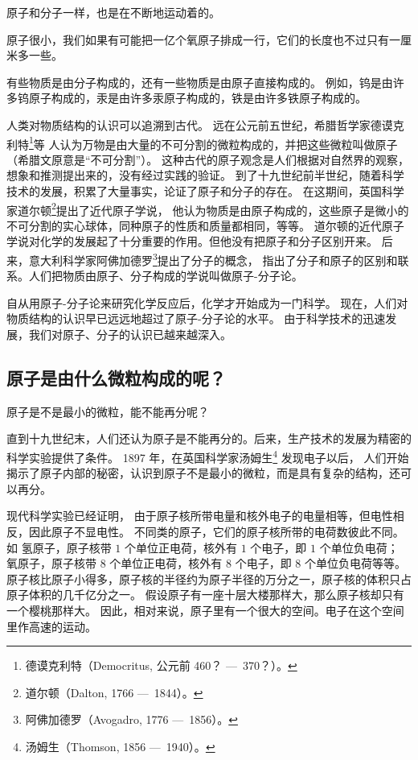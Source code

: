 原子和分子一样，也是在不断地运动着的。

原子很小，我们如果有可能把一亿个氧原子排成一行，它们的长度也不过只有一厘米多一些。

有些物质是由分子构成的，还有一些物质是由原子直接构成的。
例如，钨是由许多钨原子构成的，汞是由许多汞原子构成的，铁是由许多铁原子构成的。

人类对物质结构的认识可以追溯到古代。
远在公元前五世纪，希腊哲学家德谟克利特\footnote{德谟克利特（Democritus, 公元前 460？ —\, 370？）。}等
人认为万物是由大量的不可分割的微粒构成的，并把这些微粒叫做原子（希腊文原意是“不可分割”）。
这种古代的原子观念是人们根据对自然界的观察，想象和推测提出来的，没有经过实践的验证。
到了十九世纪前半世纪，随着科学技术的发展，积累了大量事实，论证了原子和分子的存在。
在这期间，英国科学家道尔顿\footnote{道尔顿（Dalton, 1766 —\, 1844）。}提出了近代原子学说，
他认为物质是由原子构成的，这些原子是微小的不可分割的实心球体，同种原子的性质和质量都相同，等等。
道尔顿的近代原子学说对化学的发展起了十分重要的作用。但他没有把原子和分子区别开来。
后来，意大利科学家阿佛加德罗\footnote{阿佛加德罗（Avogadro, 1776 —\, 1856）。}提出了分子的概念，
指出了分子和原子的区别和联系。人们把物质由原子、分子构成的学说叫做原子-分子论。

自从用原子-分子论来研究化学反应后，化学才开始成为一门科学。
现在，人们对物质结构的认识早已远远地超过了原子-分子论的水平。
由于科学技术的迅速发展，我们对原子、分子的认识已越来越深入。



\subsection{原子是由什么微粒构成的呢？}

原子是不是最小的微粒，能不能再分呢？

直到十九世纪末，人们还认为原子是不能再分的。后来，生产技术的发展为精密的科学实验提供了条件。
1897 年，在英国科学家汤姆生\footnote{汤姆生（Thomson, 1856 —\, 1940）。} 发现电子以后，
人们开始揭示了原子内部的秘密，认识到原子不是最小的微粒，而是具有复杂的结构，还可以再分。

现代科学实验已经证明，
由于原子核所带电量和核外电子的电量相等，但电性相反，因此原子不显电性。
不同类的原子，它们的原子核所带的电荷数彼此不同。如
氢原子，原子核带 $1$ 个单位正电荷，核外有 $1$ 个电子，即 $1$ 个单位负电荷；
氧原子，原子核带 $8$ 个单位正电荷，核外有 $8$ 个电子，即 $8$ 个单位负电荷等等。
原子核比原子小得多，原子核的半径约为原子半径的万分之一，原子核的体积只占原子体积的几千亿分之一。
假设原子有一座十层大楼那样大，那么原子核却只有一个樱桃那样大。
因此，相对来说，原子里有一个很大的空间。电子在这个空间里作高速的运动。

